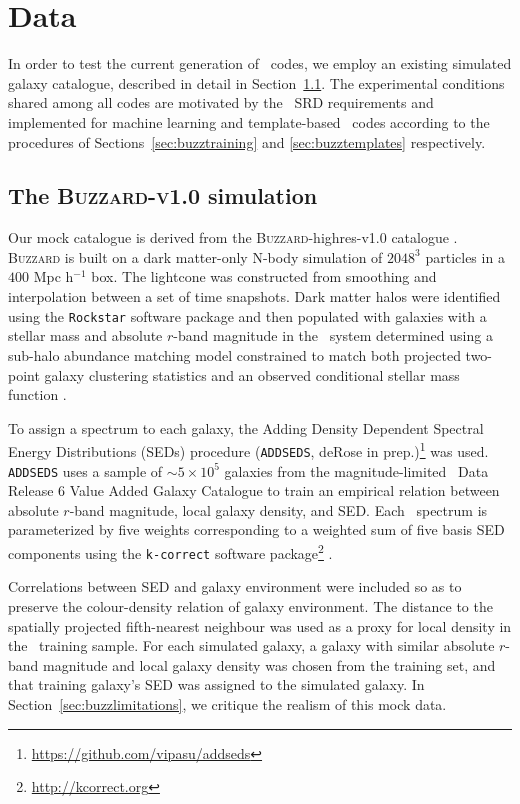 \section{Data}
\label{sec:sims}

In order to test the current generation of \pzpdf\ codes, we employ an existing simulated galaxy catalogue, described in detail in Section~\ref{sec:buzzard}.
The experimental conditions shared among all codes are motivated by the \lsst\ SRD requirements and implemented for machine learning and template-based \pzpdf\ codes according to the procedures of Sections~\ref{sec:buzztraining} and \ref{sec:buzztemplates} respectively.

\subsection{The \textsc{Buzzard-v1.0} simulation}
\label{sec:buzzard}

Our mock catalogue is derived from the \textsc{Buzzard}-highres-v1.0 catalogue  \citep[][Wechsler et al., in prep]{DeRose:19}.
\textsc{Buzzard} is built on a dark matter-only N-body simulation of $2048^{3}$ particles in a $400$ Mpc h$^{-1}$ box.
The lightcone was constructed from smoothing and interpolation between a set of time snapshots.
Dark matter halos were identified using the \texttt{Rockstar} software package \citep{Behroozi:13} and then populated with galaxies with a stellar mass and absolute $r$-band magnitude in the \sdss\ system determined using a sub-halo abundance matching model constrained to match both projected two-point galaxy clustering statistics and an observed conditional stellar mass function \citep{Reddick:13}.

To assign a spectrum to each galaxy, the Adding Density Dependent Spectral Energy Distributions (SEDs) procedure (\texttt{ADDSEDS}, deRose in prep.)\footnote{\url{https://github.com/vipasu/addseds}} was used.
\texttt{ADDSEDS} uses a sample of $\sim 5\times 10^{5}$ galaxies from the magnitude-limited \sdss\ Data Release 6 Value Added Galaxy Catalogue \citep{Blanton:05} to train an empirical relation between absolute $r$-band magnitude, local galaxy density, and SED.
Each \sdss\ spectrum is parameterized by five weights corresponding to a weighted sum of five basis SED components using the \texttt{k-correct} software package\footnote{\url{http://kcorrect.org}} \citep{Blanton:07}.

Correlations between SED and galaxy environment were included so as to preserve the colour-density relation of galaxy environment.
The distance to the spatially projected fifth-nearest neighbour was used as a proxy for local density in the \sdss\ training sample.
For each simulated galaxy, a galaxy with similar absolute $r$-band magnitude and local galaxy density was chosen from the training set, and that training galaxy's SED was assigned to the simulated galaxy.
In Section~\ref{sec:buzzlimitations}, we critique the realism of this mock data.

